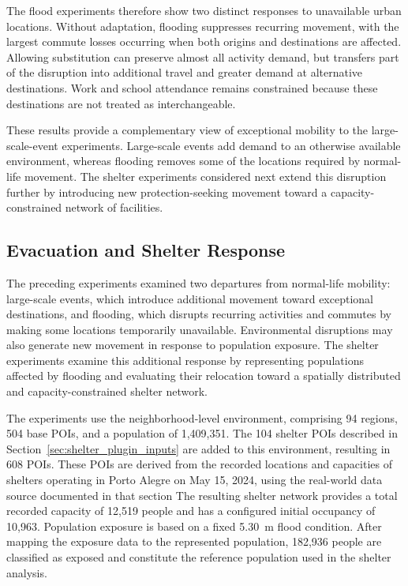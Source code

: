 The flood experiments therefore show two distinct responses to unavailable urban locations. Without adaptation, flooding suppresses recurring movement, with the largest commute losses occurring when both origins and destinations are affected. Allowing substitution can preserve almost all activity demand, but transfers part of the disruption into additional travel and greater demand at alternative destinations. Work and school attendance remains constrained because these destinations are not treated as interchangeable.

These results provide a complementary view of exceptional mobility to the large-scale-event experiments. Large-scale events add demand to an otherwise available environment, whereas flooding removes some of the locations required by normal-life movement. The shelter experiments considered next extend this disruption further by introducing new protection-seeking movement toward a capacity-constrained network of facilities.


\subsection{Evacuation and Shelter Response}
\label{sec:results_shelter_response}

The preceding experiments examined two departures from normal-life mobility: large-scale events, which introduce additional movement toward exceptional destinations, and flooding, which disrupts recurring activities and commutes by making some locations temporarily unavailable. 
Environmental disruptions may also generate new movement in response to population exposure. The shelter experiments examine this additional response by representing populations affected by flooding and evaluating their relocation toward a spatially distributed and capacity-constrained shelter network.

The experiments use the neighborhood-level environment, comprising 94 regions, 504 base POIs, and a population of 1,409,351. 
The 104 shelter POIs described in Section~\ref{sec:shelter_plugin_inputs} are added to this environment, resulting in 608 POIs. These POIs are derived from the recorded locations and capacities of shelters operating in Porto Alegre on May 15, 2024, using the real-world data source documented in that section
The resulting shelter network provides a total recorded capacity of 12,519 people and has a configured initial occupancy of 10,963.
Population exposure is based on a fixed 5.30~m flood condition. After mapping the exposure data to the represented population, 182,936 people are classified as exposed and constitute the reference population used in the shelter analysis.

